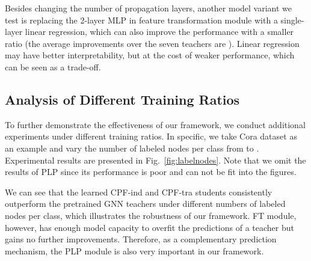 \documentclass[sigconf]{acmart}
\begin{document}
\begin{figure*}[ht]
\begin{minipage}[b]{\linewidth}
    \centering
\end{minipage}
\medskip
\begin{minipage}[b]{\linewidth}
    \centering
\end{minipage} \caption{Classification accuracies under different numbers of labeled nodes on Cora dataset. The subcaptions indicate the corresponding teacher models.}
\label{fig:labelnodes}
\end{figure*}

Besides changing the number of propagation layers, another model variant we test is replacing the 2-layer MLP in feature transformation module with a single-layer linear regression, which can also improve the performance with a smaller ratio (the average improvements over the seven teachers are ). Linear regression may have better interpretability, but at the cost of weaker performance, which can be seen as a trade-off.
\subsection{Analysis of Different Training Ratios}
To further demonstrate the effectiveness of our framework, we conduct additional experiments under different training ratios. In specific, we take Cora dataset as an example and vary the number of labeled nodes per class from  to . Experimental results are presented in Fig.~\ref{fig:labelnodes}. Note that we omit the results of PLP since its performance is poor and can not be fit into the figures.

We can see that the learned CPF-ind and CPF-tra students consistently outperform the pretrained GNN teachers under different numbers of labeled nodes per class, which illustrates the robustness of our framework. FT module, however, has enough model capacity to overfit the predictions of a teacher but gains no further improvements. Therefore, as a complementary prediction mechanism, the PLP module is also very important in our framework.
\end{document}

